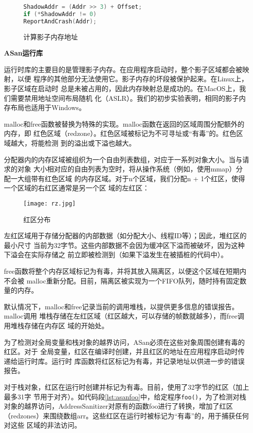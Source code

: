 \begin{figure}[H]
\begin{lstlisting}[language=C++]
ShadowAddr = (Addr >> 3) + Offset;
if (*ShadowAddr != 0)
ReportAndCrash(Addr);
\end{lstlisting}
\caption{计算影子内存地址}
\label{lst:shadowaddr}
\end{figure}


\textbf{ASan运行库}

运行时库的主要目的是管理影子内存。在应用程序启动时，整个影子区域都会被映射，以便
程序的其他部分无法使用它。影子内存的坏段被保护起来。在Linux上，影子区域在启动时
总是未被占用的，因此内存映射总是成功的。在MacOS上，我们需要禁用地址空间布局随机
化（ASLR）。我们的初步实验表明，相同的影子内存布局也适用于Windows。

malloc和free函数被替换为特殊的实现。malloc函数在返回的区域周围分配额外的内存，即
红色区域（redzone）。红色区域被标记为不可寻址或“有毒”的。红色区域越大，将能检测
到的溢出或下溢也越大。

分配器内的内存区域被组织为一个自由列表数组，对应于一系列对象大小。当与请求的对象
大小相对应的自由列表为空时，将从操作系统（例如，使用mmap）分配一大组带有红色区域
的内存区域。对于n个区域，我们分配n + 1个红区，使得一个区域的右红区通常是另一个区
域的左红区：

\begin{figure}[ht]
	\centering
	\texttt{[image: rz.jpg]}
	\caption{红区分布}
	\label{fig:rz}
\end{figure}

左红区域用于存储分配器的内部数据（如分配大小、线程ID等）；因此，堆红区的最小尺寸
当前为32字节。这些内部数据不会因为缓冲区下溢而被破坏，因为这种下溢会在实际存储之
前立即被检测到（如果下溢发生在被插桩的代码中）。

free函数将整个内存区域标记为有毒，并将其放入隔离区，以便这个区域在短期内不会被
malloc重新分配。目前，隔离区被实现为一个FIFO队列，随时持有固定数量的内存。

默认情况下，malloc和free记录当前的调用堆栈，以提供更多信息的错误报告。malloc调用
堆栈存储在左红区域（红区越大，可以存储的帧数就越多），而free调用堆栈存储在内存区
域的开始处。

为了检测对全局变量和栈对象的越界访问，ASan必须在这些对象周围创建有毒的红区。对于
全局变量，红区在编译时创建，并且红区的地址在应用程序启动时传递给运行时库。运行时
库函数将红区标记为有毒，并记录地址以供进一步的错误报告。

对于栈对象，红区在运行时创建并标记为有毒。目前，使用了32字节的红区（加上最多31字
节用于对齐）。如代码段\ref{lst:asanfoo}中，给定程序\texttt{foo()}，为了检测对栈
对象的越界访问，AddressSanitizer对原有的函数foo进行了转换，增加了红区
（redzones）来围绕数组arr。这些红区在运行时被标记为“有毒”的，用于捕获任何对这些
区域的非法访问。

